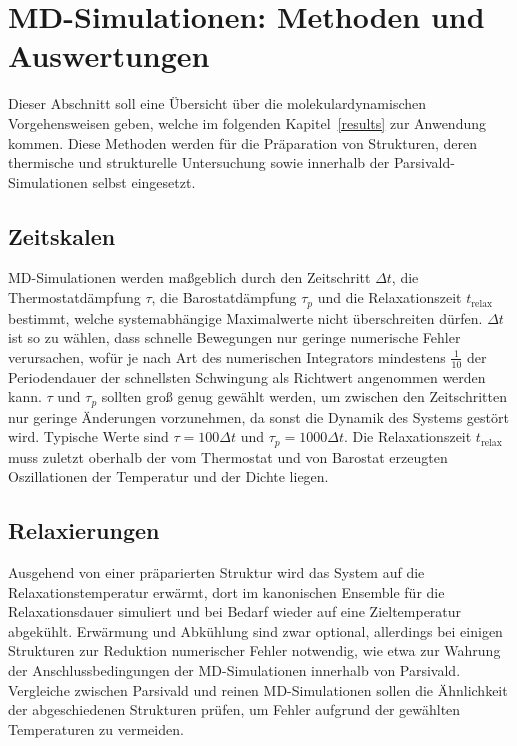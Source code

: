 \section{MD-Simulationen: Methoden und Auswertungen}
\label{mdmethods}

Dieser Abschnitt soll eine Übersicht über die molekulardynamischen Vorgehensweisen geben, welche im folgenden Kapitel~\ref{results} zur Anwendung kommen.
Diese Methoden werden für die Präparation von Strukturen, deren thermische und strukturelle Untersuchung sowie innerhalb der Parsivald-Simulationen selbst eingesetzt.

\subsection{Zeitskalen}

MD-Simulationen werden maßgeblich durch den Zeitschritt $\Delta t$, die Thermostatdämpfung $\tau$, die Barostatdämpfung $\tau_p$ und die Relaxationszeit $t_\text{relax}$ bestimmt, welche systemabhängige Maximalwerte nicht überschreiten dürfen.
$\Delta t$ ist so zu wählen, dass schnelle Bewegungen nur geringe numerische Fehler verursachen, wofür je nach Art des numerischen Integrators mindestens $\frac{1}{10}$ der Periodendauer der schnellsten Schwingung als Richtwert angenommen werden kann.
$\tau$ und $\tau_p$ sollten groß genug gewählt werden, um zwischen den Zeitschritten nur geringe Änderungen vorzunehmen, da sonst die Dynamik des Systems gestört wird.
Typische Werte sind $\tau = 100 \Delta t$ und $\tau_p = 1000 \Delta t$.
Die Relaxationszeit $t_\text{relax}$ muss zuletzt oberhalb der vom Thermostat und von Barostat erzeugten Oszillationen der Temperatur und der Dichte liegen.

\subsection{Relaxierungen}

Ausgehend von einer präparierten Struktur wird das System auf die Relaxationstemperatur erwärmt, dort im kanonischen Ensemble für die Relaxationsdauer simuliert und bei Bedarf wieder auf eine Zieltemperatur abgekühlt.
Erwärmung und Abkühlung sind zwar optional, allerdings bei einigen Strukturen zur Reduktion numerischer Fehler notwendig, wie etwa zur Wahrung der Anschlussbedingungen der MD-Simulationen innerhalb von Parsivald.
Vergleiche zwischen Parsivald und reinen MD-Simulationen sollen die Ähnlichkeit der abgeschiedenen Strukturen prüfen, um Fehler aufgrund der gewählten Temperaturen zu vermeiden.

